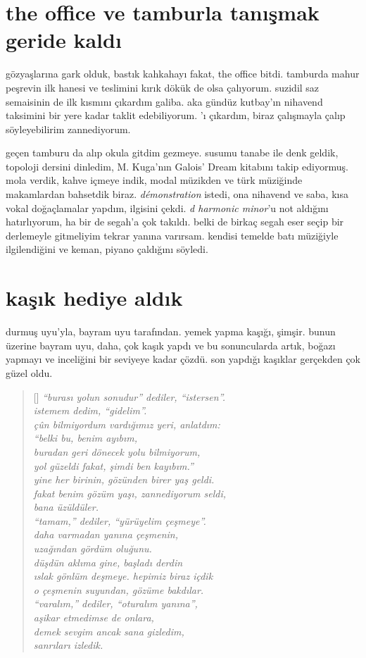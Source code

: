 \documentclass[a4paper, twocolumn]{memoir}
\begin{document}
\section{the office ve tamburla tanışmak geride kaldı}
gözyaşlarına gark olduk, bastık kahkahayı fakat, the office bitdi.
tamburda mahur peşrevin ilk hanesi ve teslimini kırık dökük de olsa
çalıyorum. suzidil saz semaisinin de ilk kısmını çıkardım galiba. aka
gündüz kutbay'ın nihavend taksimini bir yere kadar taklit edebiliyorum.
'ı çıkardım, biraz çalışmayla
çalıp söyleyebilirim zannediyorum.

geçen tamburu da alıp okula gitdim gezmeye. susumu tanabe ile denk
geldik, topoloji dersini dinledim, M. Kuga'nın Galois' Dream kitabını
takip ediyormuş. mola verdik, kahve içmeye indik, modal müzikden ve türk
müziğinde makamlardan bahsetdik biraz. \textit{démonstration} istedi, ona
nihavend ve saba, kısa vokal doğaçlamalar yapdım, ilgisini çekdi.
\textit{d harmonic minor}'u not aldığını hatırlıyorum, ha bir de segah'a
çok takıldı. belki de birkaç segah eser seçip bir derlemeyle gitmeliyim
tekrar yanına varırsam. kendisi temelde batı müziğiyle ilgilendiğini ve
keman, piyano çaldığını söyledi.
\section{kaşık hediye aldık}
durmuş uyu'yla, bayram uyu tarafından. yemek yapma kaşığı, şimşir.
bunun üzerine bayram uyu, daha, çok kaşık yapdı ve bu sonuncularda artık,
boğazı yapmayı ve inceliğini bir seviyeye kadar çözdü. son yapdığı
kaşıklar gerçekden çok güzel oldu.
\begin{verse}[\versewidth]
\itshape{}
``burası yolun sonudur'' dediler, ``istersen''.\\
istemem dedim, ``gidelim''.\\
çûn bilmiyordum vardığımız yeri, anlatdım:\\
``belki bu, benim ayıbım,\\
buradan geri dönecek yolu bilmiyorum,\\
yol güzeldi fakat, şimdi ben kayıbım.''\\
yine her birinin, gözünden birer yaş geldi.\\
fakat benim gözüm yaşı, zannediyorum seldi,\\
bana üzüldüler.\\
``tamam,'' dediler, ``yürüyelim çeşmeye''.\\
daha varmadan yanına çeşmenin,\\
uzağından gördüm oluğunu.\\
düşdün aklıma gine, başladı derdin\\
ıslak gönlüm deşmeye. hepimiz biraz içdik\\
o çeşmenin suyundan, gözüme bakdılar.\\
``varalım,'' dediler, ``oturalım yanına'',\\
aşikar etmedimse de onlara,\\
demek sevgim ancak sana gizledim,\\
sanrıları izledik.\\
\end{verse}
\end{document}

